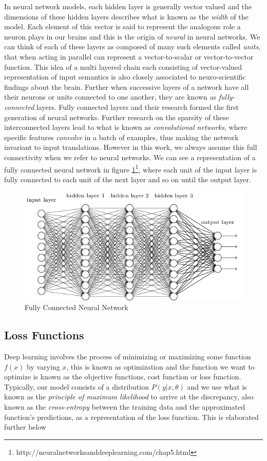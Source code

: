 \documentclass[12pt]{extarticle}
\numberwithin{equation}{section}
\begin{document}
	In neural network models, each hidden layer is generally vector valued and the dimensions of these hidden layers describes what is known as the \textit{width} of the model. Each element of this vector is said to represent the analogous role a neuron plays in our brains and this is the origin of \textit{neural} in neural networks. We can think of each of these layers as composed of many such elements called \textit{units}, that when acting in parallel can represent a vector-to-scalar or vector-to-vector function. This idea of a multi layered chain each consisting of vector-valued representation of input semantics is also closely associated to neuro-scientific findings about the brain. Further when successive layers of a network have all their neurons or units connected to one another, they are known as \textit{fully-connected} layers. Fully connected layers and their research formed the first generation of neural networks. Further research on the sparsity of these interconnected layers lead to what is known as \textit{convolutional networks}\cite{LeCun:1998:CNI:303568.303704}, where specific features \textit{convolve} in a batch of examples, thus making the network invariant to input translations. However in this work, we always assume this full connectivity when we refer to neural networks. We can see a representation of a fully connected neural network in figure \ref{nn-fully-connected}\footnote{http://neuralnetworksanddeeplearning.com/chap5.html}, where each unit of the input layer is fully connected to each unit of the next layer and so on until the output layer.
	\begin{figure}[h]
		\vspace{0.2cm}
		\centering
		\includegraphics[scale=0.7]{neuralnetwork}
		\caption{Fully Connected Neural Network
			\label{nn-fully-connected}}
	\end{figure}
	\subsection{Loss Functions}
	Deep learning involves the process of minimizing or maximizing some function $f(x)$ by varying $x$\cite{Goodfellow-et-al-2016}, this is known as optimization and the function we want to optimize is known as the objective functions, cost function or loss function. Typically, our model consists of a distribution $P(y | x, \theta)$ and we use what is known as the \textit{principle of maximum likelihood} to arrive at the discrepancy, also known as the \textit{cross-entropy} between the training data and the approximated function's predictions, as a representation of the loss function. This is elaborated further below
\end{document}

